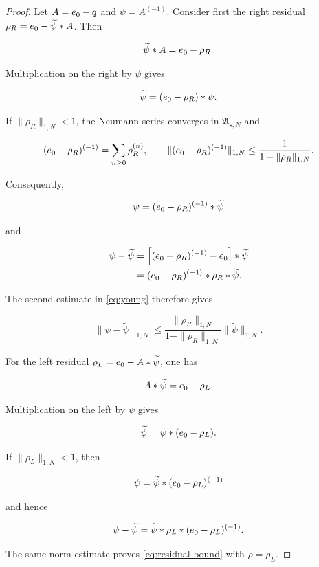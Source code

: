 \documentclass[3p,12pt,authoryear]{elsarticle}
\theoremstyle{definition}
\theoremstyle{remark}
\newcommand{\ez}{e_{\mathstrut 0}}
\begin{document}
\begin{proof}
Let $A=\ez-q$ and $\psi=A^{(-1)}$. Consider first the right residual $\rho_R=\ez-\widetilde\psi*A$. Then

\begin{equation*}
\widetilde\psi*A=\ez-\rho_R.
\end{equation*}

Multiplication on the right by $\psi$ gives

\begin{equation*}
\widetilde\psi=(\ez-\rho_R)*\psi.
\end{equation*}

If $\|\rho_R\|_{1,N}<1$, the Neumann series converges in $\mathfrak A_{s,N}$ and

\begin{equation*}
(\ez-\rho_R)^{(-1)}
=
\sum_{n\geq0}\rho_R^{(n)},
\qquad
\|(\ez-\rho_R)^{(-1)}\|_{1,N}
\leq
\frac{1}{1-\|\rho_R\|_{1,N}}.
\end{equation*}

Consequently,

\begin{equation*}
\psi=(\ez-\rho_R)^{(-1)}*\widetilde\psi
\end{equation*}

and

\begin{equation*}
\begin{aligned}
\psi-\widetilde\psi
&=\left[(\ez-\rho_R)^{(-1)}-\ez\right]*\widetilde\psi\\
&=(\ez-\rho_R)^{(-1)}*\rho_R*\widetilde\psi.
\end{aligned}
\end{equation*}

The second estimate in \eqref{eq:young} therefore gives

\begin{equation*}
\|\psi-\widetilde\psi\|_{1,N}
\leq
\frac{\|\rho_R\|_{1,N}}{1-\|\rho_R\|_{1,N}}
\|\widetilde\psi\|_{1,N}.
\end{equation*}

For the left residual $\rho_L=\ez-A*\widetilde\psi$, one has

\begin{equation*}
A*\widetilde\psi=\ez-\rho_L.
\end{equation*}

Multiplication on the left by $\psi$ gives

\begin{equation*}
\widetilde\psi=\psi*(\ez-\rho_L).
\end{equation*}

If $\|\rho_L\|_{1,N}<1$, then

\begin{equation*}
\psi=\widetilde\psi*(\ez-\rho_L)^{(-1)}
\end{equation*}

and hence

\begin{equation*}
\psi-\widetilde\psi
=
\widetilde\psi*\rho_L*(\ez-\rho_L)^{(-1)}.
\end{equation*}

The same norm estimate proves \eqref{eq:residual-bound} with $\rho=\rho_L$.
\end{proof}
\end{document}
